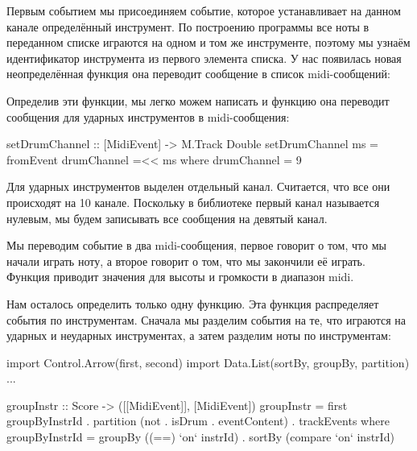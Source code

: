 Первым событием мы присоединяем событие, которое устанавливает
на данном канале определённый инструмент. По построению программы
все ноты в переданном списке играются на одном и том же
инструменте, поэтому мы узнаём идентификатор инструмента из
первого элемента списка. У нас появилась новая неопределённая 
функция  она переводит сообщение в список 
midi-сообщений:


Определив эти функции, мы легко можем написать и функцию
 она переводит сообщения для ударных 
инструментов в midi-сообщения:

\begin{code}
setDrumChannel :: [MidiEvent] -> M.Track Double
setDrumChannel ms = fromEvent drumChannel =<< ms 
    where drumChannel = 9        
\end{code}

Для ударных инструментов выделен отдельный канал.
Считается, что все они происходят на 10 канале. 
Поскольку в библиотеке  первый канал 
называется нулевым, мы будем записывать все сообщения
на девятый канал.

Мы переводим событие в два midi-сообщения, первое говорит
о том, что мы начали играть ноту, а второе говорит о том, что 
мы закончили её играть. Функция  приводит 
значения для высоты и громкости в диапазон midi. 

Нам осталось определить только одну функцию. Эта функция
распределяет события по инструментам. Сначала мы разделим
события на те, что играются на ударных и неударных инструментах,
а затем разделим  ноты по инструментам:

\begin{code}
import Control.Arrow(first, second)
import Data.List(sortBy, groupBy, partition)
...

groupInstr :: Score -> ([[MidiEvent]], [MidiEvent])
groupInstr = first groupByInstrId . 
    partition (not . isDrum . eventContent) . trackEvents
    where groupByInstrId = groupBy ((==) `on` instrId) . 
                           sortBy  (compare `on` instrId)
\end{code}

